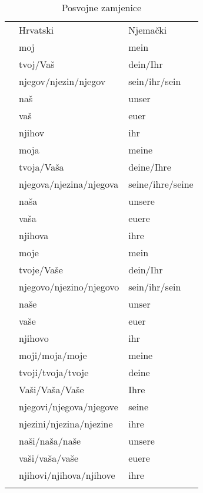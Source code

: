 \documentclass[12pt,german]{article}
\makeatletter
\newenvironment{zamjenicetbl}[1]
{%
  \begin{table}[H]
    \caption{#1 zamjenice}
    \begin{tabular}{@{} lll @{}}
    \toprule
      & Hrvatski  &  Njemački \\
}{%
      \bottomrule
    \end{tabular}
  \end{table}}
\makeatother
\begin{document}
\begin{multicols}{2}
\begin{zamjenicetbl}{Posvojne}
  \zamjenicepadez{Muški rod}
    & moj           & mein \\
    & tvoj/Vaš      & dein/Ihr \\
    & njegov/njezin/njegov & sein/ihr/sein \\
    & naš           & unser \\
    & vaš           & euer \\
    & njihov        & ihr \\
  \endzamjenicepadez
  \zamjenicepadez{Ženski rod}
    & moja         & meine \\
    & tvoja/Vaša & deine/Ihre \\
    & njegova/njezina/njegova & seine/ihre/seine \\
    & naša & unsere \\
    & vaša & euere \\
    & njihova & ihre \\
  \endzamjenicepadez
  \zamjenicepadez{Srednji rod}
    & moje   & mein \\
    & tvoje/Vaše   & dein/Ihr \\
    & njegovo/njezino/njegovo   & sein/ihr/sein \\
    & naše   & unser \\
    & vaše   & euer \\
    & njihovo   & ihr \\
  \endzamjenicepadez
  \zamjenicepadez{Množina}
    & moji/moja/moje & meine       \\
    & tvoji/tvoja/tvoje & deine \\
    & Vaši/Vaša/Vaše & Ihre \\
    & njegovi/njegova/njegove & seine  \\
    & njezini/njezina/njezine & ihre \\
    & naši/naša/naše & unsere \\
    & vaši/vaša/vaše & euere \\
    & njihovi/njihova/njihove & ihre \\
  \endzamjenicepadez
\end{zamjenicetbl}


\end{multicols}
\end{document}
